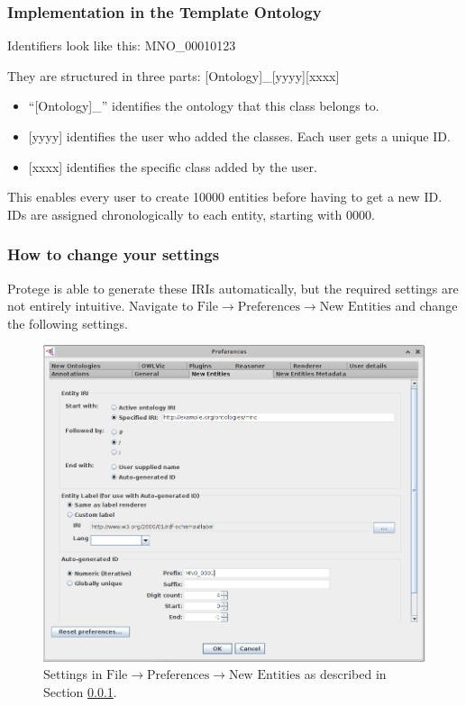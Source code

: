 \subsubsection{Implementation in the Template Ontology}\label{sssec:implementation-in-the-mno}

Identifiers look like this: MNO\_00010123

They are structured in three parts: {[}Ontology{]}\_{[}yyyy{]}{[}xxxx{]}
\begin{itemize}
    \item ``{[}Ontology{]}\_'' identifies the ontology that this class belongs to. 
    \item {[}yyyy{]} identifies the user who added the classes. Each user gets a unique ID.
    \item {[}xxxx{]} identifies the
specific class added by the user. 
\end{itemize}

This enables every user to create 10000 entities before having to get a new ID. IDs are assigned chronologically to each entity, starting with 0000.


\subsubsection{How to change your
settings}
\label{sssec:how-to-change-your-settings}

Protege is able to generate these IRIs automatically, but the required settings are not entirely intuitive. Navigate to \textit{$\text{File}\rightarrow\text{Preferences}\rightarrow\text{New Entities}$} and change the following settings. 

\begin{figure}
    \centering
    \includegraphics[width=\textwidth]{fig/protege-settings.png}
    \caption{Settings in \textit{$\text{File}\rightarrow\text{Preferences}\rightarrow\text{New Entities}$} as described in Section \ref{sssec:implementation-in-the-mno}.}
    \label{fig:protege-settings}
\end{figure}

